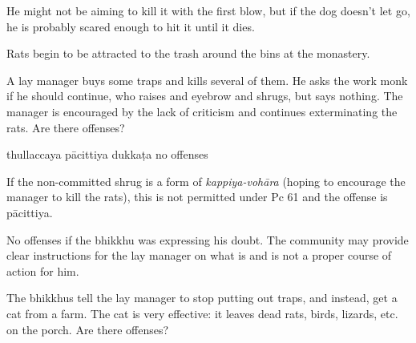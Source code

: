 \begin{exam}{\autoExamName}
\begin{problem*}
\begin{parts}
    \begin{solution}
      He might not be aiming to kill it with the first blow, but if the dog doesn't let go, he is probably scared enough to hit it until it dies.
    \end{solution}

  \end{parts}

\end{problem*}

\problemDivide

\begin{problem*}

  Rats begin to be attracted to the trash around the bins at the monastery.

  \bigskip

  \begin{parts}

    \item A lay manager buys some traps and kills several of them. He asks the work monk if he should continue, who raises and eyebrow and shrugs, but says nothing. The manager is encouraged by the lack of criticism and continues exterminating the rats. Are there offenses?

    \bigskip

    \begin{answers}{4}
      \bChoices
       thullaccaya \eAns
       pācittiya\eAns
       dukkaṭa\eAns
       no offenses\eAns
      \eChoices
    \end{answers}

    \begin{solution}
      If the non-committed shrug is a form of \emph{kappiya-vohāra} (hoping to encourage the manager to kill the rats), this is not permitted under Pc 61 and the offense is pācittiya.

      No offenses if the bhikkhu was expressing his doubt.
      The community may provide clear instructions for the lay manager on what is and is not a proper course of action for him.
    \end{solution}

    \bigskip

    \item The bhikkhus tell the lay manager to stop putting out traps, and instead, get a cat from a farm. The cat is very effective: it leaves dead rats, birds, lizards, etc. on the porch. Are there offenses?

    \bigskip


\end{parts}
\end{problem*}
\end{exam}
